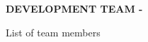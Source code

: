 {\bfseries \MakeUppercase{Development Team} - \TeamName}

\vspace{0.1in}

List of team members

\LoadTeamMembers